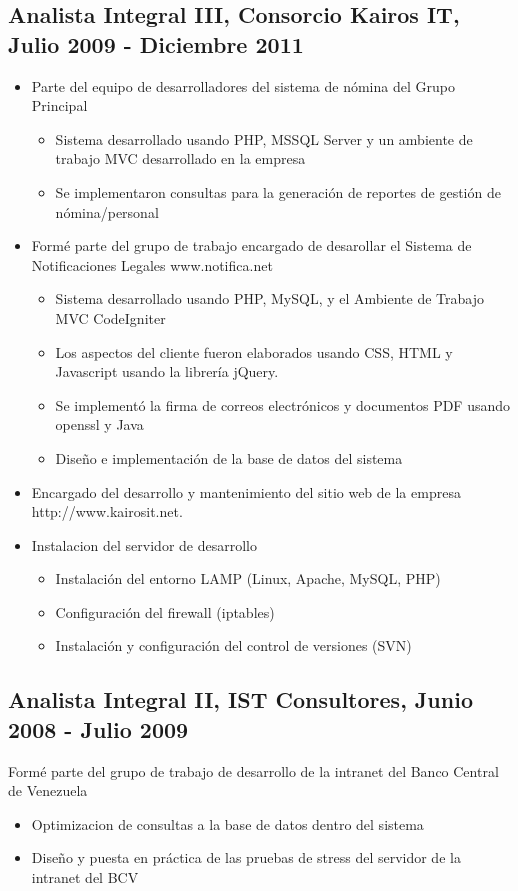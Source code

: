 \documentclass[letterpaper,11pt]{report}
\begin{document}
\subsection*{Analista Integral III, Consorcio Kairos IT, Julio 2009 - Diciembre 2011}

\begin{itemize}
\item Parte del equipo de desarrolladores del sistema de nómina del Grupo Principal
  \begin{itemize}
    \item Sistema desarrollado usando PHP, MSSQL Server y un ambiente de trabajo MVC desarrollado en la empresa
    \item Se implementaron consultas para la generación de reportes de gestión de nómina/personal
  \end{itemize}
\end{itemize}

\begin{itemize}
\item
  Formé parte del grupo de trabajo encargado de desarollar el Sistema de Notificaciones Legales www.notifica.net
  \begin{itemize}
  \item Sistema desarrollado usando PHP, MySQL, y el Ambiente de Trabajo MVC CodeIgniter
  \item Los aspectos del cliente fueron elaborados usando CSS, HTML y Javascript usando la librería jQuery.
  \item Se implementó la firma de correos electrónicos y documentos PDF usando openssl y Java
  \item Dise\~{n}o e implementación de la base de datos del sistema
  \end{itemize}
\item
  Encargado del desarrollo y mantenimiento del sitio web de la empresa http://www.kairosit.net.
\item Instalacion del servidor de desarrollo
  \begin{itemize}
  \item Instalación del entorno LAMP (Linux, Apache, MySQL, PHP)
  \item Configuración del firewall (iptables)
  \item Instalación y configuración del control de versiones (SVN)
  \end{itemize}
\end{itemize}

\subsection*{Analista Integral II, IST Consultores, Junio 2008 - Julio 2009}
Formé parte del grupo de trabajo de desarrollo de la intranet del Banco Central de Venezuela
	\begin{itemize}
	\item Optimizacion de consultas a la base de datos dentro del sistema
	\item Dise\~{n}o y puesta en práctica de las pruebas de stress del servidor de la intranet del BCV
	\end{itemize}
\end{document}
